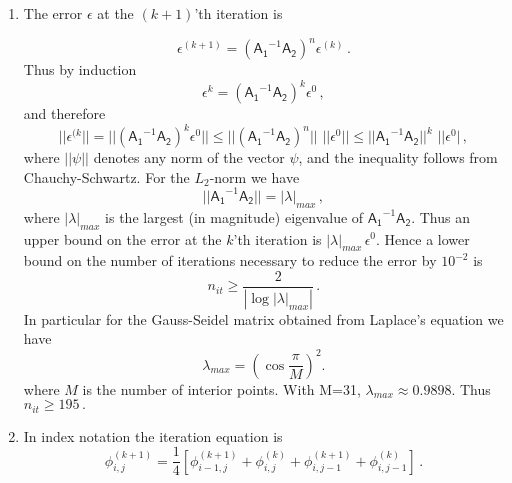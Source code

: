\documentclass[11pt]{article}
\newcommand{\com}{\, ,}
\newcommand{\per}{\, .}
\def\beq{\begin{equation}}
\def\eeq{\end{equation}}
\newcommand{\ep}{\ensuremath {\epsilon}}
\begin{document}
\begin{enumerate}[label=(\alph*)]
    \item The error $\ep$ at the $(k+1)$'th iteration  is

        \beq
        \ep^{(k+1)} = \left(\mathsf{A_1}^{-1}\mathsf{A_2}\right)^n\ep^{(k)}\per
        \eeq
        Thus by induction 
        \beq
        \ep^{k} = \left(\mathsf{A_1}^{-1}\mathsf{A_2}\right)^k\ep^0\com
        \eeq
        and therefore
        \beq
        ||\ep^{(k}|| = ||\left(\mathsf{A_1}^{-1}\mathsf{A_2}\right)^k\ep^0|| \leq ||\left(\mathsf{A_1}^{-1}\mathsf{A_2}\right)^n||\,\, ||\ep^0||\leq||\mathsf{A_1}^{-1}\mathsf{A_2}||^k\,\, ||\ep^0| \com
        \eeq
        where $|| \mathsf{\psi} ||$ denotes any norm of the vector $\mathsf{\psi}$, and the inequality follows from Chauchy-Schwartz. For the $L_2$-norm we have
        \beq
        ||\mathsf{A_1}^{-1}\mathsf{A_2}|| = |\lambda|_{max}\com
        \eeq
        where $|\lambda|_{max}$ is the largest (in magnitude) eigenvalue of $\mathsf{A_1}^{-1}\mathsf{A_2}$. Thus an upper bound on the error at the $k$'th iteration is $|\lambda|_{max}\,\ep^0$. Hence a lower bound on the number of iterations necessary to reduce the error by $10^{-2}$ is
        \beq
        n_{it} \ge \frac{2}{|\log{|\lambda|_{max}}|}\per
        \eeq
        In particular for the Gauss-Seidel matrix obtained from Laplace's equation we have
        \beq
        \lambda_{max} = \left(\cos\frac{\pi}{M}\right)^2.
        \eeq
        where $M$ is the number of interior points. With M=31, $\lambda_{max} \approx 0.9898$. Thus $n_{it} \ge 195\per$

    \item In index notation the iteration equation is
        \beq
        \phi_{i,j}^{(k+1)} = \frac{1}{4}\left[\phi_{i-1,j}^{(k+1)}+\phi_{i,j}^{(k)}+\phi_{i,j-1}^{(k+1)}+\phi_{i,j-1}^{(k)}\right]\per
        \eeq

\end{enumerate}



\end{document}

